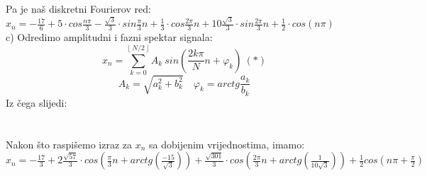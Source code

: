 \documentclass[12pt]{article}
\begin{document}
\begin{enumerate}
\begin{center}
{ 
 \\
 \\
\vspace{0.25cm}
Pa je naš diskretni Fourierov red:\\
\underline{$x_n = -\frac{17}{6} + 5 \cdot cos \frac{n\pi}{3} - \frac{\sqrt{3}}{3} \cdot sin \frac{\pi}{3}n + \frac{1}{3} \cdot cos\frac{2\pi}{3}n + 10\frac{\sqrt{3}}{3} \cdot sin\frac{2\pi}{3}n + \frac{1}{2}\cdot cos(n\pi)$}\\
\vspace{0.25cm}
c) Odredimo amplitudni i fazni spektar signala:\\
 \begin{equation*}
		    x_n = \sum_{k = 0}^{\lfloor~N/2~\rfloor} A_k~sin(\frac{2k\pi}{N}n + \varphi_k) ~(*)
		\end{equation*}
		\begin{equation*}
		    A_k = \sqrt{a_k^2 + b_k^2} \quad \varphi_k = arctg\frac{a_k}{b_k}
		\end{equation*}
Iz čega slijedi:\\
\\
\\
Nakon što raspišemo izraz za $x_n$ sa dobijenim vrijednostima, imamo:\\
\underline{$x_n = -\frac{17}{3} + 2\frac{\sqrt{57}}{3}\cdot cos (\frac{\pi}{3}n + arctg (\frac{-15}{\sqrt{3}})) +  \frac{\sqrt{301}}{3} \cdot cos(\frac{2\pi}{3}n +  arctg(\frac{1}{10\sqrt{3}})) + \frac{1}{2}cos(n\pi + \frac{\pi}{2})$}
}
\end{center}


\end{enumerate}
\end{document}
